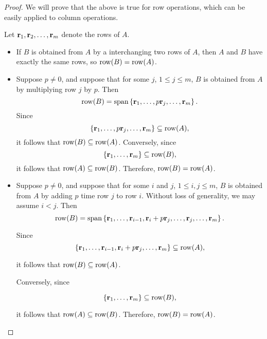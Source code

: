 \begin{proof}
  We will prove that the above is true for row operations, which can
  be easily applied to column operations.

  Let $\mbox{\bf r}_1, \mbox{\bf r}_2, \ldots, \mbox{\bf r}_m$ denote the rows of
  $A$.

  \begin{itemize}
  \item If $B$ is obtained from $A$ by a interchanging two rows of
    $A$, then $A$ and $B$ have exactly the same rows, so
    $\row(B)=\row(A)$.

  \item Suppose $p\neq 0$, and suppose that for some $j$,
    $1\leq j\leq m$, $B$ is obtained from $A$ by multiplying row $j$
    by $p$.  Then
    \begin{equation*}
      \row(B)=\sspan\set{\vect{r}_1, \ldots, p\vect{r}_{j}, \ldots, \vect{r}_m}.
    \end{equation*}
    Since
    \begin{equation*}
      \set{\vect{r}_1, \ldots,
        p\vect{r}_{j}, \ldots, \vect{r}_m} \subseteq\row(A),
    \end{equation*}
    it follows that $\row(B)\subseteq\row(A)$.
    Conversely, since
    \begin{equation*}
      \set{\vect{r}_1, \ldots,
        \vect{r}_m}\subseteq\row(B),
    \end{equation*}
    it follows that $\row(A)\subseteq\row(B)$.
    Therefore, $\row(B)=\row(A)$.
  \item Suppose $p\neq 0$, and suppose that for some $i$ and $j$,
    $1\leq i,j\leq m$, $B$ is obtained from $A$ by adding $p$ time row
    $j$ to row $i$.  Without loss of generality, we may assume $i<j$.
    Then
    \begin{equation*}
      \row(B)=\sspan\set{\vect{r}_1, \ldots, \vect{r}_{i-1},
        \vect{r}_i+p\vect{r}_j, \ldots,\vect{r}_j,\ldots, \vect{r}_m}.
    \end{equation*}

    Since
    \begin{equation*}
      \set{\vect{r}_1, \ldots, \vect{r}_{i-1},
        \vect{r}_i+p\vect{r}_{j}, \ldots, \vect{r}_m}
      \subseteq\row(A),
    \end{equation*}

    it follows that $\row(B)\subseteq\row(A)$.

    Conversely, since

    \begin{equation*}
      \set{\vect{r}_1, \ldots, \vect{r}_m}\subseteq\row(B),
    \end{equation*}

    it follows that $\row(A)\subseteq\row(B)$.
    Therefore, $\row(B)=\row(A)$.
  \end{itemize}
\end{proof}


